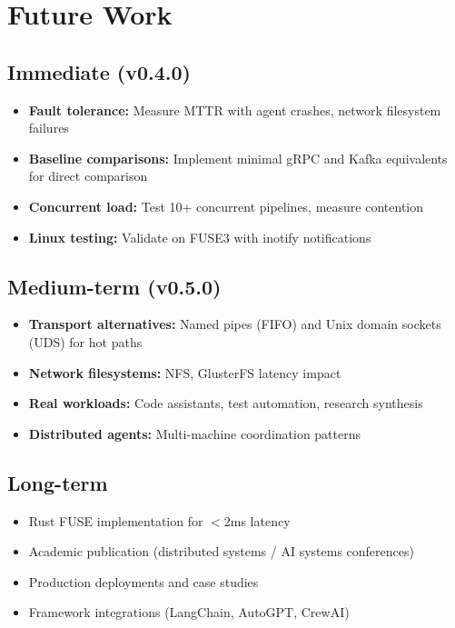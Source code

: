 \documentclass[11pt]{article}
\begin{document}
\section{Future Work}

\subsection{Immediate (v0.4.0)}

\begin{itemize}
\item \textbf{Fault tolerance:} Measure MTTR with agent crashes, network filesystem failures
\item \textbf{Baseline comparisons:} Implement minimal gRPC and Kafka equivalents for direct comparison
\item \textbf{Concurrent load:} Test 10+ concurrent pipelines, measure contention
\item \textbf{Linux testing:} Validate on FUSE3 with inotify notifications
\end{itemize}

\subsection{Medium-term (v0.5.0)}

\begin{itemize}
\item \textbf{Transport alternatives:} Named pipes (FIFO) and Unix domain sockets (UDS) for hot paths
\item \textbf{Network filesystems:} NFS, GlusterFS latency impact
\item \textbf{Real workloads:} Code assistants, test automation, research synthesis
\item \textbf{Distributed agents:} Multi-machine coordination patterns
\end{itemize}

\subsection{Long-term}

\begin{itemize}
\item Rust FUSE implementation for $<$2ms latency
\item Academic publication (distributed systems / AI systems conferences)
\item Production deployments and case studies
\item Framework integrations (LangChain, AutoGPT, CrewAI)
\end{itemize}
\end{document}
